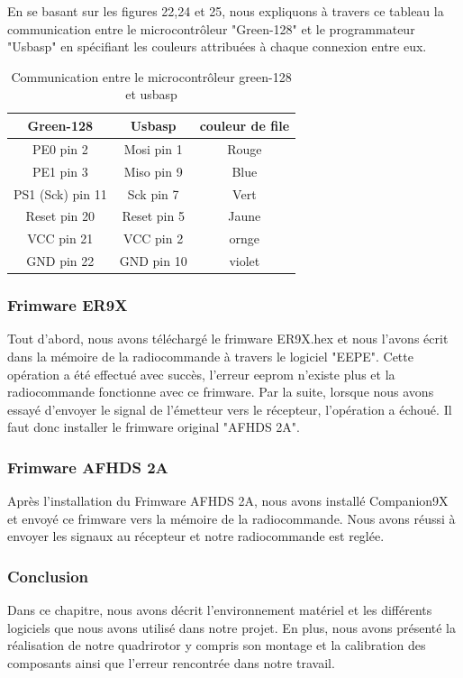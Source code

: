 	
	En se basant sur les figures 22,24 et 25, nous expliquons à travers ce tableau la communication entre le microcontrôleur "Green-128" et le programmateur "Usbasp" en spécifiant les couleurs attribuées à chaque connexion entre eux.
	
	\begin{table}[H]
		\begin{center}
			\caption{Communication entre le microcontrôleur green-128 et usbasp }
			\begin{tabular}{|c|c|c|}
				\hline
				\centering
				Green-128 &	Usbasp & couleur de file \\
				\hline
				PE0 pin 2 & Mosi pin 1 & Rouge  \\
				\hline
				PE1 pin 3 & Miso pin 9 & Blue  \\
				\hline
				PS1 (Sck)  pin 11 & Sck pin 7 & Vert  \\
				\hline
				Reset pin 20 & Reset pin 5 & Jaune \\
				\hline
				VCC pin 21 & VCC pin 2 &  ornge \\
				\hline
				GND pin 22 & GND pin 10 & violet \\
				\hline
			\end{tabular}
		\end{center}
	\end{table}
	\subsubsection{Frimware ER9X}
	Tout d'abord, nous avons téléchargé le frimware ER9X.hex et nous l'avons écrit dans la mémoire de la radiocommande à travers le logiciel "EEPE". Cette opération a été effectué avec succès, l'erreur eeprom n'existe plus et la radiocommande fonctionne avec ce frimware. Par la suite, lorsque nous avons essayé d'envoyer le signal de l'émetteur vers le récepteur, l'opération a échoué. Il faut donc installer le frimware original "AFHDS 2A".
	\subsubsection{Frimware AFHDS 2A}
	Après l'installation du Frimware AFHDS 2A, nous avons installé Companion9X et envoyé ce frimware vers la mémoire de la radiocommande. Nous avons réussi à envoyer les signaux au récepteur et notre radiocommande est reglée.
	\subsubsection{Conclusion}
	Dans ce chapitre, nous avons décrit l'environnement matériel et les différents logiciels que nous avons utilisé dans notre projet. En plus, nous avons présenté la réalisation de notre quadrirotor y compris son montage et la calibration des composants ainsi que l'erreur rencontrée dans notre travail.


